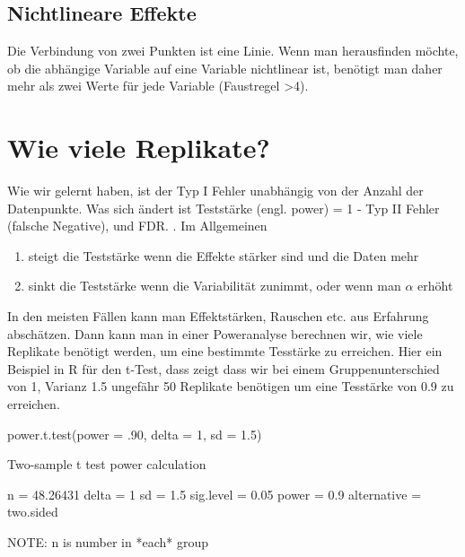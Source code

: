 \documentclass[a4paper,twoside]{tufte-book}\usepackage[]{graphicx}\usepackage[]{color}
\begin{document}
\subsection{Nichtlineare Effekte}

Die Verbindung von zwei Punkten ist eine Linie. Wenn man herausfinden möchte, ob die abhängige Variable auf eine Variable nichtlinear ist, benötigt man daher mehr als zwei Werte für jede Variable (Faustregel >4). 


\section{Wie viele Replikate?}

Wie wir gelernt haben, ist der Typ I Fehler unabhängig von der Anzahl der Datenpunkte. Was sich ändert ist Teststärke (engl. power) = 1 - Typ II Fehler (falsche Negative), und FDR. . Im Allgemeinen 

\begin{enumerate}
\item steigt die Teststärke wenn die Effekte stärker sind und die Daten mehr
\item sinkt die Teststärke wenn die Variabilität zunimmt, oder wenn man $\alpha$ erhöht
\end{enumerate}

In den meisten Fällen kann man Effektstärken, Rauschen etc. aus Erfahrung abschätzen. Dann kann man in einer Poweranalyse berechnen wir, wie viele Replikate benötigt werden, um eine bestimmte Tesstärke zu erreichen. Hier ein Beispiel in R für den t-Test, dass zeigt dass wir bei einem Gruppenunterschied von 1, Varianz 1.5 ungefähr 50 Replikate benötigen um eine Tesstärke von 0.9 zu erreichen. 

\begin{Schunk}
\begin{Sinput}
power.t.test(power = .90, delta = 1, sd = 1.5)
\end{Sinput}
\begin{Soutput}

     Two-sample t test power calculation 

              n = 48.26431
          delta = 1
             sd = 1.5
      sig.level = 0.05
          power = 0.9
    alternative = two.sided

NOTE: n is number in *each* group
\end{Soutput}
\end{Schunk}
\end{document}
